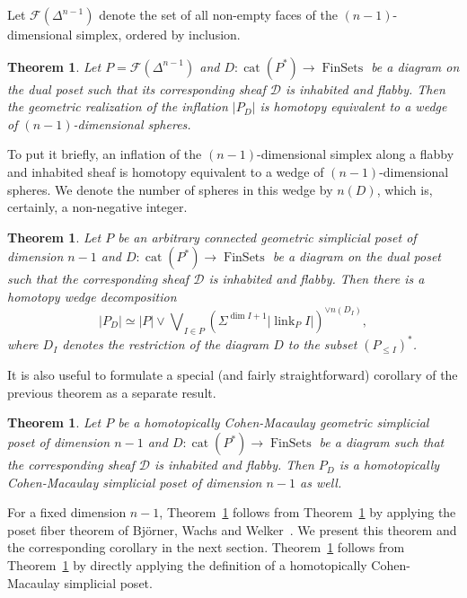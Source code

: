 \documentclass[english,12pt,oneside]{amsproc}
\DeclareMathOperator{\cat}{cat}
\DeclareMathOperator{\FinSets}{FinSets}
\DeclareMathOperator{\link}{link}
\newcommand{\ca}[1]{\mathcal{#1}}
\newcounter{stmcounter}[section]
\numberwithin{equation}{section}
\theoremstyle{plain}
\newtheorem{thm}[stmcounter]{Theorem}
\theoremstyle{definition}
\theoremstyle{remark}
\begin{document}
Let $\ca{F}(\Delta^{n-1})$ denote the set of all non-empty faces of the $(n-1)$-dimensional simplex, ordered by inclusion.

\begin{thm}\label{thmSimplex}
Let $P=\ca{F}(\Delta^{n-1})$  and  $D\colon \cat(P^*)\to \FinSets$ be a diagram on the dual poset such that its corresponding sheaf $\ca{D}$ is inhabited  and  flabby. Then the geometric realization of the inflation $|P_D|$  is homotopy equivalent to a wedge of $(n-1)$-dimensional spheres.
\end{thm}

To put it briefly, an inflation of the $(n-1)$-dimensional simplex along a flabby and inhabited sheaf is homotopy equivalent to a wedge of $(n-1)$-dimensional spheres. We denote the number of spheres in this wedge by $n(D)$, which is, certainly, a non-negative integer.

\begin{thm}\label{thmGenSimpPoset}
Let $P$ be an arbitrary connected geometric simplicial poset of dimension $n-1$  and  $D\colon \cat(P^*)\to \FinSets$ be a diagram on the dual poset such that the corresponding sheaf $\ca{D}$ is inhabited and flabby. Then there is a homotopy wedge decomposition
\begin{equation}\label{eqMainWedgeDecomposition}
|P_D|\simeq |P|\vee\bigvee\nolimits_{I\in P}(\Sigma^{\dim I+1}|\link_PI|)^{\vee n(D_I)},
\end{equation}
where $D_I$ denotes the restriction of the diagram $D$ to the subset $(P_{\leqslant I})^*$.
\end{thm}

It is also useful to formulate a special (and fairly straightforward) corollary of the previous theorem as a separate result.

\begin{thm}\label{thmCM}
Let $P$ be a homotopically Cohen-Macaulay geometric simplicial poset of dimension $n-1$ and $D\colon \cat(P^*)\to \FinSets$ be a diagram such that the corresponding sheaf $\ca{D}$ is inhabited  and  flabby. Then $P_D$ is a homotopically Cohen-Macaulay simplicial poset of dimension $n-1$ as well.
\end{thm}

For a fixed dimension $n-1$, Theorem~\ref{thmGenSimpPoset} follows from Theorem~\ref{thmSimplex} by applying the poset fiber theorem of Bj\"{o}rner, Wachs  and  Welker~\cite{BjWW}. We present this theorem and the corresponding corollary in the next section. Theorem~\ref{thmCM} follows from Theorem~\ref{thmGenSimpPoset} by directly applying the definition of a homotopically Cohen-Macaulay simplicial poset.
\end{document}
